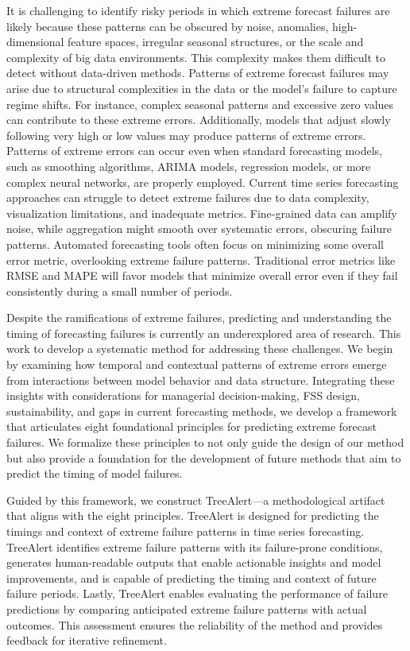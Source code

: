 \documentclass[preprint,12pt]{elsarticle}
\begin{document}
It is challenging to identify risky periods in which extreme forecast failures are likely because these patterns can be obscured by noise, anomalies, high-dimensional feature spaces, irregular seasonal structures, or the scale and complexity of big data environments. This complexity makes them difficult to detect without data-driven methods. Patterns of extreme forecast failures may arise due to structural complexities in the data or the model’s failure to capture regime shifts. For instance, complex seasonal patterns and excessive zero values can contribute to these extreme errors. Additionally, models that adjust slowly following very high or low values may produce patterns of extreme errors. Patterns of extreme errors can occur even when standard forecasting models, such as smoothing algorithms, ARIMA models, regression models, or more complex neural networks, are properly employed. Current time series forecasting approaches can struggle to detect extreme failures due to data complexity, visualization limitations, and inadequate metrics. Fine-grained data can amplify noise, while aggregation might smooth over systematic errors, obscuring failure patterns. Automated forecasting tools often focus on minimizing some overall error metric, overlooking extreme failure patterns. Traditional error metrics like RMSE and MAPE will favor models that minimize overall error even if they fail consistently during a small number of periods. 

Despite the ramifications of extreme failures, predicting and understanding the timing of forecasting failures is currently an underexplored area of research. This work to develop a systematic method for addressing these challenges. We begin by examining how temporal and contextual patterns of extreme errors emerge from interactions between model behavior and data structure. Integrating these insights with considerations for managerial decision-making, FSS design, sustainability, and gaps in current forecasting methods, we develop a framework that articulates eight foundational principles for predicting extreme forecast failures. We formalize these principles to not only guide the design of our method but also provide a foundation for the development of future methods that aim to predict the timing of model failures. 

Guided by this framework, we construct TreeAlert---a methodological artifact that aligns with the eight principles. TreeAlert is designed for predicting the timings and context of extreme failure patterns in time series forecasting. TreeAlert identifies extreme failure patterns with its failure-prone conditions, generates human-readable outputs that enable actionable insights and model improvements, and is capable of predicting the timing and context of future failure periods. Lastly, TreeAlert enables evaluating the performance of failure predictions by comparing anticipated extreme failure patterns with actual outcomes. This assessment ensures the reliability of the method and provides feedback for iterative refinement.
\end{document}
